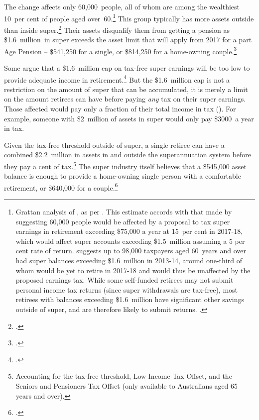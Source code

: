 \documentclass[continuous]{grattan}
\begin{document}
The change affects only 60,000~people, all of whom are among the wealthiest 10~per cent of people aged over~60.\footnote{\label{footnote:n-affected-earnings-tax-in-retirement}%
  Grattan analysis of \textcite{ABS-SIH11-CURF}, as per . %
  This estimate accords with that made by \textcite{PBO-2015-Leyonhjelm-super-costing} suggesting 60,000 people would be affected by a proposal to tax super earnings in retirement exceeding \$75,000 a year at 15~per cent in 2017-18, which would affect super accounts exceeding \$1.5~million assuming a 5 per cent rate of return. 
  \textcite{ATO2016SampleFile1314} suggests up to 98,000 taxpayers aged 60~years and over had super balances exceeding \$1.6~million in 2013-14, 
  around one-third of whom would be yet to retire in 2017-18 and would thus be unaffected by the proposed earnings tax. 
  While some self-funded retirees may not submit personal income tax returns (since super withdrawals are tax-free), most retirees with balances exceeding \$1.6~million have significant other savings outside of super, and are therefore likely to submit returns. \textcite[][28]{DaleyCoatesWoodEtAl2015Super}.%
}   This group typically has more assets outside than inside super.\footcite[][28]{DaleyCoatesWoodEtAl2015Super}  
Their assets disqualify them from getting a pension as \$1.6~million~in super exceeds the asset limit that will apply from 2017 for a part Age Pension -- \$541,250 for a single, or \$814,250 for a home-owning couple.\footcite{DHS-2016-Asset-test}

Some argue that a \$1.6~million cap on tax-free super earnings will be too low to provide adequate income in retirement.\footcite{McCrann-scott-morrison-super-changes-big-positive-deal}  
But the \$1.6~million cap is not a restriction on the amount of super that can be accumulated, it is merely a limit on the amount retirees can have before paying \emph{any} tax on their super earnings. %
Those affected would pay only a fraction of their total income in tax (). 
For example, someone with \$2~million of assets in super would only pay \$3000~a year in tax. 

Given the tax-free threshold outside of super, a single retiree can have a combined \$2.2~million in assets in and outside the superannuation system before they pay a cent of tax.\footnote{Accounting for the tax-free threshold, Low Income Tax Offset, and the Seniors and Pensioners Tax Offset (only available to Australians aged 65 years and over).}  
The super industry itself believes that a \$545,000 asset balance is enough to provide a home-owning single person with a comfortable retirement, or \$640,000 for a couple.\footcite{ASFA2015} 
\end{document}
